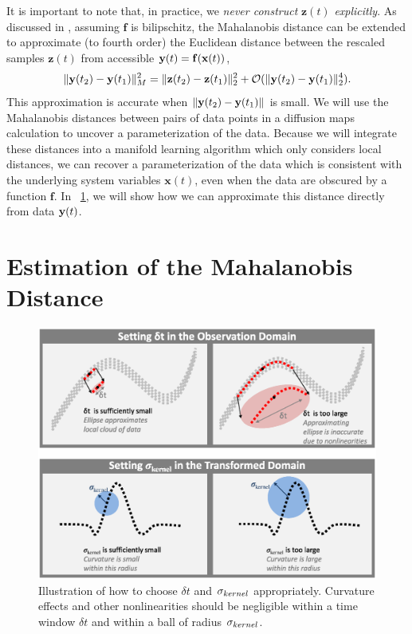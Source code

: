 %
It is important to note that, in practice, we {\em never construct} $\mathbf{z}(t)$ {\em explicitly}.
%
As discussed in \cite{singer2008non}, assuming $\mathbf{f}$ is bilipschitz, the Mahalanobis distance can be extended to approximate (to fourth order) the Euclidean distance between the rescaled samples $\mathbf{z}(t)$ from accessible $\mathbf{y}(t) = \mathbf{f} (\mathbf{x}(t))$,
%
\begin{equation} \label{eq:mahalanobis2}
\| \mathbf{y}(t_2) - \mathbf{y}(t_1) \|^2_M = \| \mathbf{z}(t_2) - \mathbf{z}(t_1) \|^2_2 + \mathcal{O}(\| \mathbf{y}(t_2) - \mathbf{y}(t_1) \|^4_2).
\end{equation}
%
This approximation is accurate when $\| \mathbf{y}(t_2) - \mathbf{y}(t_1) \|$ is small.
%
We will use the Mahalanobis distances between pairs of data points in a diffusion maps calculation to uncover a parameterization of the data. 
%
Because we will integrate these distances into a manifold learning algorithm which only considers local distances, we can recover a parameterization of the data which is consistent with the underlying system variables $\mathbf{x}(t)$, even when the data are obscured by a function $\mathbf{f}$.
%
In \sec~\ref{sec:analysis}, we will show how we can approximate this distance directly from data $\mathbf{y}(t)$.

\section{Estimation of the Mahalanobis Distance} \label{sec:analysis}

\begin{figure}[t]
\centering
\includegraphics[width=\textwidth]{schematic}
\caption[Schematic of relevant parameters for analysis of multiscale data]{Illustration of how to choose $\delta t$ and $\sigma_{kernel}$ appropriately. 	Curvature effects and other nonlinearities should be negligible within a time window $\delta t$ and within a ball of radius $\sigma_{kernel}$.}
\label{fig:schematic}
\end{figure}


